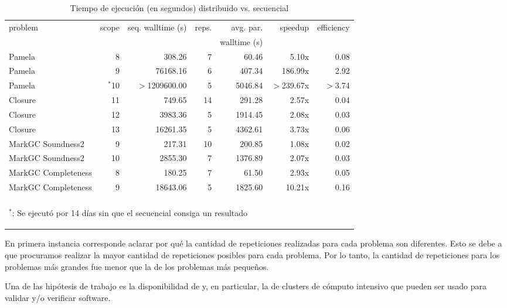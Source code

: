 \begin{table}
	\footnotesize
	\begin{tabular}{lrrrrrr}
		\toprule
		problem	&	scope	&	seq. walltime (s)	&	reps. & avg. par.	&	speedup	&	efficiency \\
			&		&	&	 & walltime (s)	&		&	 \\
		\cmidrule(r){1-7}
		Pamela	&	8	&	308.26	&		7 & 60.46	& 5.10x	&	0.08 \\
		Pamela	&	9	&	76168.16	&	6& 407.34	& 	186.99x	&	2.92 \\
		Pamela	&	$^*$10	&	$>$1209600.00	&	5 & 5046.84	&	$>$239.67x	&	$>$3.74 \\
		\cmidrule(r){1-7}
		Closure	&	11	&	749.65	&	14 & 291.28	&	2.57x	&	0.04 \\
		Closure	&	12	&	3983.36	&	5 & 1914.45	&	2.08x	&	0.03 \\
		Closure	&	13	&	16261.35	& 5 &	4362.61	&	3.73x	&	0.06 \\
		\cmidrule(r){1-7}
		MarkGC Soundness2	&	9	&	217.31	&	10 & 200.85	&	1.08x	&	0.02 \\
		MarkGC Soundness2	&	10	&	 2855.30	&	7 &1376.89	&	2.07x	&	0.03 \\
		\cmidrule(r){1-7}
		MarkGC Completeness	&	8	&	180.25	&	7 & 61.50	&	2.93x	&	0.05 \\
		MarkGC Completeness	&	9	&	18643.06	&	5 & 1825.60	&	10.21x	&	0.16 \\
		\bottomrule
		\\
		\multicolumn{7}{l}{\begin{tiny}$^*$: Se ejecutó por 14 días sin que el \ssolver secuencial consiga un resultado\end{tiny}}
	\end{tabular}
	\caption{Tiempo de ejecución (en segundos) distribuido vs. secuencial}
	\label{tab:resultados}
\end{table}

En primera instancia corresponde aclarar por qué la cantidad de repeticiones
realizadas para cada problema son diferentes. Esto se debe a que procuramos
realizar la mayor cantidad de repeticiones posibles para cada problema. Por lo
tanto, la cantidad de repeticiones para los problemas más grandes fue menor
que la de los problemas más pequeños.

Una de las hipótesis de trabajo es la disponibilidad de \hard y, en particular, la de clusters de cómputo intensivo que pueden ser usado para validar y/o verificar software. 

